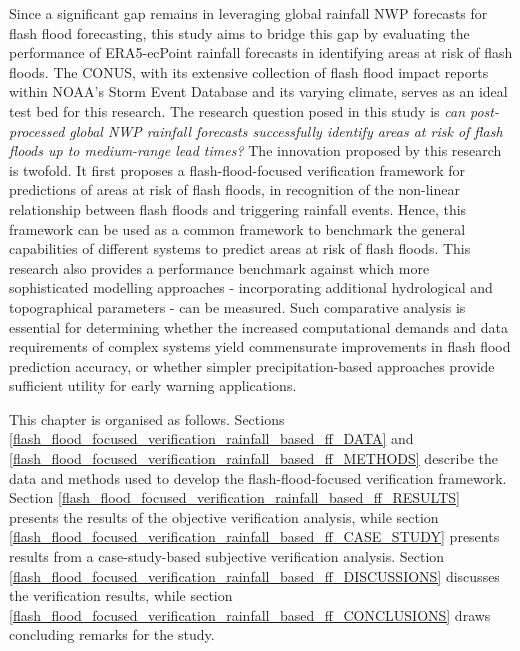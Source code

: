 Since a significant gap remains in leveraging global rainfall NWP forecasts for flash flood forecasting, this study aims to bridge this gap by evaluating the performance of ERA5-ecPoint rainfall forecasts in identifying areas at risk of flash floods. The CONUS, with its extensive collection of flash flood impact reports within NOAA's Storm Event Database and its varying climate, serves as an ideal test bed for this research. The research question posed in this study is \textit{can post-processed global NWP rainfall forecasts successfully identify areas at risk of flash floods up to medium-range lead times?} The innovation proposed by this research is twofold. It first proposes a flash-flood-focused verification framework for predictions of areas at risk of flash floods, in recognition of the non-linear relationship between flash floods and triggering rainfall events. Hence, this framework can be used as a common framework to benchmark the general capabilities of different systems to predict areas at risk of flash floods. This research also provides a performance benchmark against which more sophisticated modelling approaches - incorporating additional hydrological and topographical parameters - can be measured. Such comparative analysis is essential for determining whether the increased computational demands and data requirements of complex systems yield commensurate improvements in flash flood prediction accuracy, or whether simpler precipitation-based approaches provide sufficient utility for early warning applications.


This chapter is organised as follows. Sections \ref{flash_flood_focused_verification_rainfall_based_ff_DATA} and \ref{flash_flood_focused_verification_rainfall_based_ff_METHODS} describe the data and methods used to develop the flash-flood-focused verification framework. Section \ref{flash_flood_focused_verification_rainfall_based_ff_RESULTS} presents the results of the objective verification analysis, while section \ref{flash_flood_focused_verification_rainfall_based_ff_CASE_STUDY} presents results from a case-study-based subjective verification analysis. Section \ref{flash_flood_focused_verification_rainfall_based_ff_DISCUSSIONS} discusses the verification results, while section \ref{flash_flood_focused_verification_rainfall_based_ff_CONCLUSIONS} draws concluding remarks for the study.



